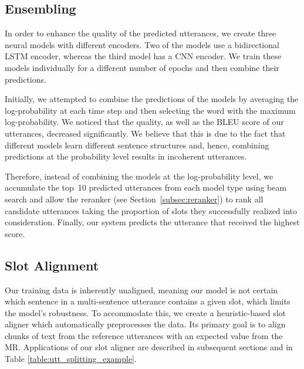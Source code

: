 \documentclass[11pt,a4paper]{article}
\begin{document}
\subsection{Ensembling}
\label{sec:ensembling}

In order to enhance the quality of the predicted utterances, we create three neural models with different encoders. Two of the models use a bidirectional LSTM \cite{hochreiter1997long} encoder, whereas the third model has a CNN \cite{lecun1998gradient} encoder. We train these models individually for a different number of epochs and then combine their predictions.

Initially, we attempted to combine the predictions of the models by averaging the log-probability at each time step and then selecting the word with the maximum log-probability. We noticed that the quality, as well as the BLEU score of our utterances, decreased significantly. We believe that this is due to the fact that different models learn different sentence structures and, hence, combining predictions at the probability level results in incoherent utterances.

Therefore, instead of combining the models at the log-probability level, we accumulate the top~10 predicted utterances from each model type using beam search and allow the reranker (see Section~\ref{subsec:reranker}) to rank all candidate utterances taking the proportion of slots they successfully realized into consideration. Finally, our system predicts the utterance that received the highest score.


\subsection{Slot Alignment}
\label{subsec:slot_alignment}

Our training data is inherently unaligned, meaning our model is not certain which sentence in a multi-sentence utterance contains a given slot, which limits the model's robustness. To accommodate this, we create a heuristic-based slot aligner which automatically preprocesses the data. Its primary goal is to align chunks of text from the reference utterances with an expected value from the MR. Applications of our slot aligner are described in subsequent sections and in Table \ref{table:utt_splitting_example}.
\end{document}
